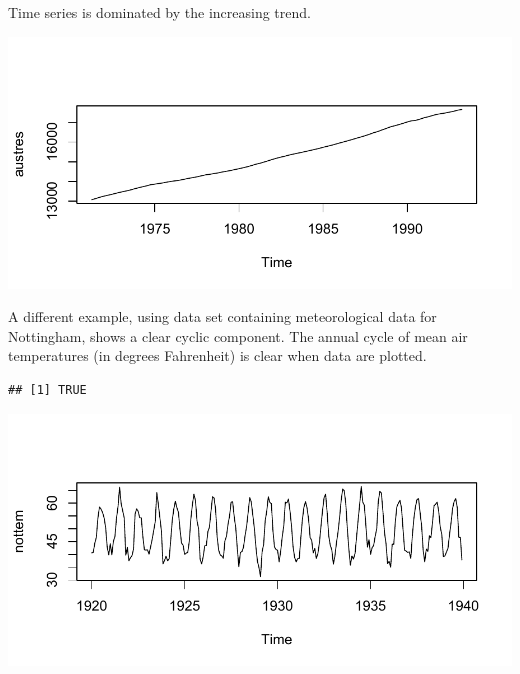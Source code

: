 \documentclass[krantz2]{krantz}\usepackage{knitr}
\begin{document}
Time series  is dominated by the increasing trend.

\begin{knitrout}\footnotesize
{}\color{fgcolor}\begin{kframe}
\begin{alltt}
\end{alltt}
\end{kframe}

{\centering \includegraphics[width=.7\textwidth]{figure/pos-ts-02-1} 

}


\end{knitrout}

A different example, using data set   containing meteorological data for Nottingham, shows a clear cyclic component. The annual cycle of mean air temperatures (in degrees Fahrenheit) is clear when data are plotted.

\begin{knitrout}\footnotesize
{}\color{fgcolor}\begin{kframe}
\begin{alltt}
\end{alltt}
\begin{verbatim}
## [1] TRUE
\end{verbatim}
\begin{alltt}
\end{alltt}
\end{kframe}

{\centering \includegraphics[width=.7\textwidth]{figure/pos-ts-03-1} 

}


\end{knitrout}
\end{document}
